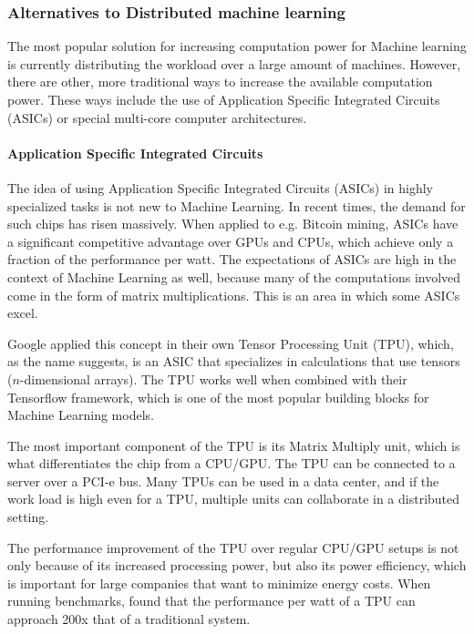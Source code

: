 
\subsubsection{Alternatives to Distributed machine learning}
The most popular solution for increasing computation power for Machine
learning is currently distributing the workload over a large amount of machines. However, there are other, more traditional ways to increase the available computation power. These ways include the use of Application Specific Integrated Circuits (ASICs) or special multi-core computer architectures.

\paragraph{Application Specific Integrated Circuits}
The idea of using Application Specific Integrated Circuits (ASICs) in highly specialized tasks is not new to Machine Learning. In recent times, the demand for such chips has risen massively\cite{Metz18}.
When applied to e.g. Bitcoin mining, ASICs have a significant competitive advantage over GPUs and CPUs, which achieve only a fraction of the performance per watt. The expectations of ASICs are high in the context of Machine Learning as well, because many of the computations involved come in the form of matrix multiplications. This is an area in which some ASICs excel.

Google applied this concept in their own Tensor Processing Unit (TPU)\cite{Sato17}, which, as the name suggests, is an ASIC that specializes in calculations that use tensors ($n$-dimensional arrays). The TPU works well when combined with their Tensorflow\cite{Tensorflow2015}\cite{Tensorflow2016} framework, which is one of the most popular building blocks for Machine Learning models.

The most important component of the TPU is its Matrix Multiply unit, which is what differentiates the chip from a CPU/GPU. The TPU can be connected to a server over a PCI-e bus. Many TPUs can be used in a data center, and if the work load is high even for a TPU, multiple units can collaborate in a distributed setting.

The performance improvement of the TPU over regular CPU/GPU setups is not only because of its increased processing power, but also its power efficiency, which is important for large companies that want to minimize energy costs. When running benchmarks, \citet{Joup17} found that the performance per watt of a TPU can approach 200x that of a traditional system.

